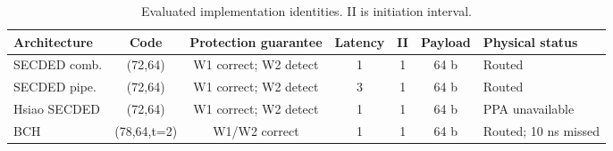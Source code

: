 \begin{table}[t]
\caption{Evaluated implementation identities. II is initiation interval.}
\label{tab:identities}
\centering
\footnotesize
\setlength{\tabcolsep}{5.2pt}
\begin{tabular}{lcccccl}
\toprule
Architecture & Code & Protection guarantee & Latency & II & Payload & Physical status \\
\midrule
SECDED comb. & (72,64) & W1 correct; W2 detect & 1 & 1 & 64 b & Routed \\
SECDED pipe. & (72,64) & W1 correct; W2 detect & 3 & 1 & 64 b & Routed \\
Hsiao SECDED & (72,64) & W1 correct; W2 detect & 1 & 1 & 64 b & PPA unavailable \\
BCH & (78,64,t=2) & W1/W2 correct & 1 & 1 & 64 b & Routed; 10 ns missed \\
\bottomrule
\end{tabular}
\end{table}
